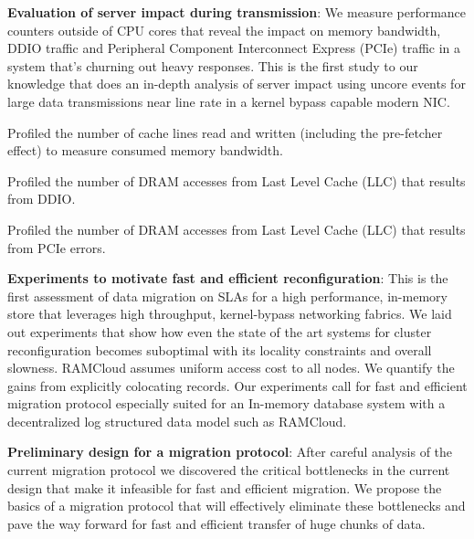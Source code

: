 \begin{myitemize}
    \item{\textbf{Evaluation of server impact during transmission}}: We measure performance counters outside of CPU cores that reveal the impact on memory bandwidth,
     DDIO traffic and Peripheral Component Interconnect Express (PCIe) traffic in a system that's churning out heavy responses. This is the first study to our knowledge that does an 
     in-depth analysis of server impact using uncore events for large data transmissions near line rate in a kernel bypass capable modern NIC.
     \begin{myitemize}
     \item Profiled the number of cache lines read and written (including the pre-fetcher effect) to measure consumed memory bandwidth.
     \item Profiled the number of DRAM accesses from Last Level Cache (LLC) that results from DDIO.
     \item Profiled the number of DRAM accesses from Last Level Cache (LLC) that results from PCIe errors.
     \end{myitemize}


  \item{\textbf{Experiments to motivate fast and efficient reconfiguration}}: This is the first assessment of data migration on SLAs for a high performance,
    in-memory store that leverages high throughput, kernel-bypass networking fabrics. 
   We laid out experiments that show how even the state of the art systems for cluster reconfiguration becomes suboptimal with its locality constraints and overall slowness. 
   RAMCloud assumes uniform access cost to all nodes. We quantify the gains from explicitly colocating records.
   Our experiments call for fast and efficient migration protocol especially suited for an In-memory database system with a decentralized log structured data model such as RAMCloud.

  \item{\textbf{Preliminary design for a migration protocol}}: After careful analysis of the current migration protocol
   we discovered the critical bottlenecks in the current design that make it infeasible for fast and efficient migration.
   We propose the basics of a \linebreak migration protocol that will effectively eliminate these bottlenecks and pave the way
   forward for fast and efficient transfer of huge chunks of data.

\end{myitemize}

